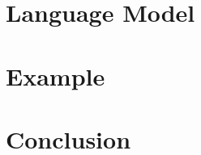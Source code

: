 \documentclass{llncs}
\begin{document}
\newpage
\section{Language Model}

\newpage
\section{Example}

\newpage
\section{Conclusion}

{}

\end{document}
